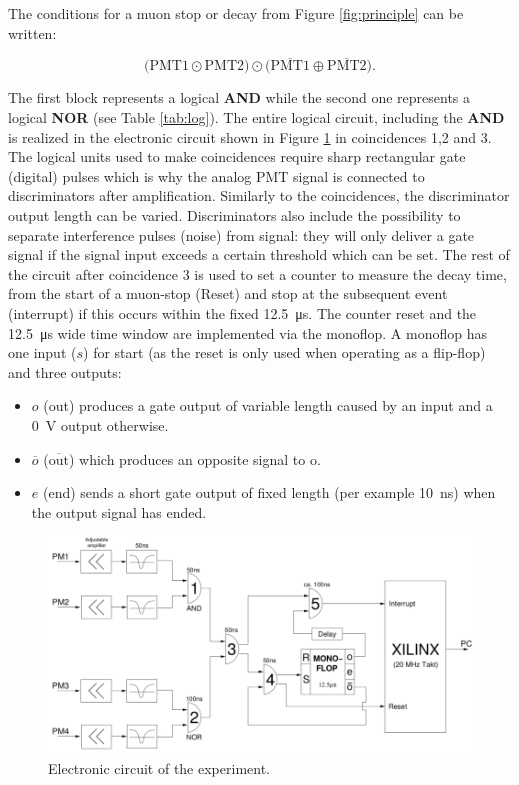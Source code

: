 The conditions for a muon stop or decay from Figure \ref{fig:principle} can be written:

\begin{equation}
\big(\text{PMT}1 \odot \text{PMT}2\big) \odot \big(\overline{\text{PMT}1} \oplus \overline{\text{PMT}2}\big).
\end{equation}

The first block represents a logical \textbf{AND} while the second one represents a logical \textbf{NOR} (see Table \ref{tab:log}). The entire logical circuit, including the \textbf{AND} is realized in the electronic circuit shown in Figure \ref{fig:elek} in coincidences 1,2 and 3. The logical units used to make coincidences require sharp rectangular gate (digital) pulses which is why the analog PMT signal is connected to discriminators after amplification. Similarly to the coincidences, the discriminator output length can be varied. Discriminators also include the possibility to separate interference pulses (noise) from signal: they will only deliver a gate signal if the signal input exceeds a certain threshold which can be set. The rest of the circuit after coincidence 3 is used to set a counter to measure the decay time, from the start of a muon-stop (Reset) and stop at the subsequent event (interrupt) if this occurs within the fixed \SI{12.5}{\micro\second}. The counter reset and the \SI{12.5}{\micro\second} wide time window are implemented via the monoflop. A monoflop has one input ($s$) for start (as the reset is only used when operating as a flip-flop) and three outputs:

\begin{itemize}
\item $o$ (out) produces a gate output of variable length caused by an input and a \SI{0}{\volt} output otherwise.
\item $\overline{o}$ ($\overline{\text{out}}$) which produces an opposite signal to o.
\item $e$ (end) sends a short gate output of fixed length (per example \SI{10}{\nano\second}) when the output signal has ended.
\end{itemize}

\begin{figure}[htbp]
\centering
\includegraphics[width=0.7\linewidth]{./fig/electronicc.png}
\caption{Electronic circuit of the experiment.}
\label{fig:elek}
\end{figure}

